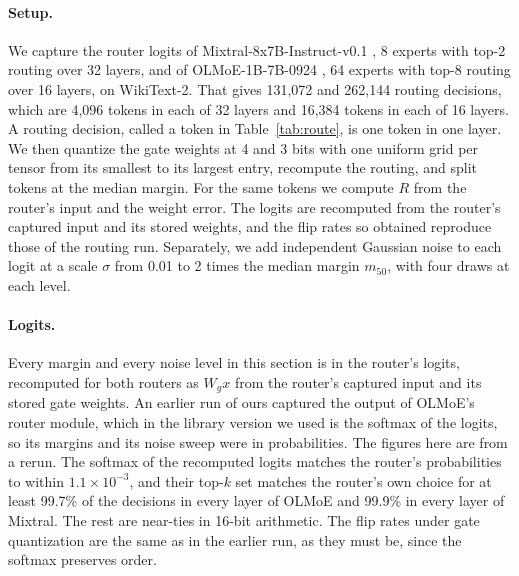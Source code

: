 \documentclass[10pt]{article}
\begin{document}
\paragraph{Setup.} We capture the router logits of Mixtral-8x7B-Instruct-v0.1
\citep{jiang2024mixtral}, 8 experts with top-2 routing over 32 layers, and of OLMoE-1B-7B-0924
\citep{muennighoff2025olmoe}, 64 experts with top-8 routing over 16 layers, on WikiText-2. That
gives 131{,}072 and 262{,}144 routing decisions, which are 4{,}096 tokens in each of 32 layers and
16{,}384 tokens in each of 16 layers. A routing decision, called a token in
Table~\ref{tab:route}, is one token in one layer. We then quantize the gate weights at 4
and 3 bits with one uniform grid per tensor from its smallest to its largest entry, recompute the
routing, and split tokens at the median margin. For the same tokens we compute $R$ from the
router's input and the weight error. The logits are recomputed from the router's captured input
and its stored weights, and the flip rates so obtained reproduce those of the routing run. Separately, we add
independent Gaussian noise to each logit at a scale $\sigma$ from 0.01 to 2 times the median
margin $m_{50}$, with four draws at each level.

\paragraph{Logits.} Every margin and every noise level in this section is in the router's
logits, recomputed for both routers as $W_g x$ from the router's captured input and its stored
gate weights. An earlier run of ours captured the output of OLMoE's router module, which in the
library version we used is the softmax of the logits, so its margins and its noise sweep were in
probabilities. The figures here are from a rerun. The softmax of the recomputed logits matches
the router's probabilities to within $1.1\times10^{-3}$, and their top-$k$ set matches the
router's own choice for at least 99.7\% of the decisions in every layer of OLMoE and 99.9\% in
every layer of Mixtral. The rest are near-ties in 16-bit arithmetic. The flip rates under gate
quantization are the same as in the earlier run, as they must be, since the softmax preserves
order.
\end{document}

